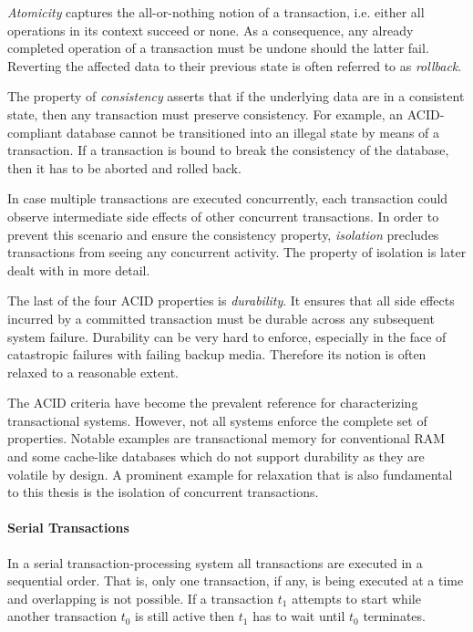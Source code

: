 \emph{Atomicity} captures the all-or-nothing notion of a transaction, i.e.
either all operations in its context succeed or none. As a consequence, any
already completed operation of a transaction must be undone should the latter
fail. Reverting the affected data to their previous state is often referred to
as \emph{rollback}.

The property of \emph{consistency} asserts that if the underlying data are in a
consistent state, then any transaction must preserve consistency. For example,
an ACID-compliant database cannot be transitioned into an illegal state by means
of a transaction. If  a transaction is bound to break the consistency of the
database, then it has to be aborted and rolled back.

In case multiple transactions are executed concurrently, each transaction could
observe intermediate side effects of other concurrent transactions. In order to
prevent this scenario and ensure the consistency property, \emph{isolation}
precludes transactions from seeing any concurrent activity. The property of
isolation is later dealt with in more detail.

The last of the four ACID properties is \emph{durability}. It ensures that all
side effects incurred by a committed transaction must be durable across any
subsequent system failure. Durability can be very hard to enforce, especially in
the face of catastropic failures with failing backup media. Therefore its notion
is often relaxed to a reasonable extent.

The ACID criteria have become the prevalent reference for characterizing
transactional systems. However, not all systems enforce the complete set of
properties. Notable examples are transactional memory for conventional RAM and
some cache-like databases which do not support durability as they are volatile
by design. A prominent example for relaxation that is also fundamental to this thesis is the isolation of concurrent transactions.

\paragraph{Serial Transactions}

In a serial transaction-processing system all transactions are executed in a
sequential order. That is, only one transaction, if any, is being executed at a
time and overlapping is not possible. If a transaction $t_1$ attempts to start
while another transaction $t_0$ is still active then $t_1$ has to wait until
$t_0$ terminates.

